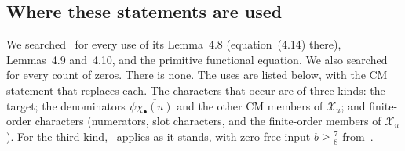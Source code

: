 \documentclass[11pt]{article}
\numberwithin{equation}{section}
\begin{document}
\subsection{Where these statements are used}\label{sec:s2-uses}
We searched~\cite{OAI78} for every use of its Lemma~4.8 (equation~(4.14) there),
Lemmas~4.9 and~4.10, and the primitive functional equation. We also
searched for every count of zeros. There is none. The uses are listed below, with the CM statement that replaces
each. The characters that occur are of three kinds: the target; the denominators $\psi\overline{\chi_\bullet(u)}$
and the other CM members of $\mathcal X_u$; and finite-order characters (numerators, slot characters, and the
finite-order members of $\mathcal X_u$). For the third kind,~\cite{OAI78} applies as it stands, with zero-free
input $b\ge\frac78$ from~\cite[Theorem~1.1]{OAI78}.
\end{document}
